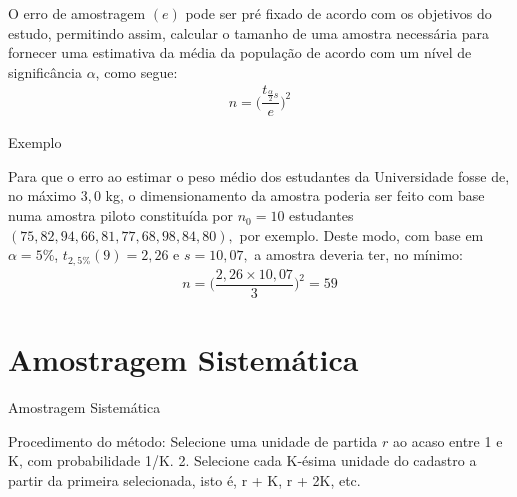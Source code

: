\documentclass[14pt,aspectratio=1610]{beamer}
\begin{document}
\begin{frame}{}
    \begin{block}{}
    \justifying
O erro de amostragem $(e)$ pode ser pré fixado de acordo com os objetivos do
estudo, permitindo assim, calcular o tamanho de uma amostra necessária para fornecer uma estimativa da média da população de acordo com um nível de significância $\alpha$, como segue:
\begin{align*}
    n=\Big(\dfrac{t_{\frac{\alpha}{2}s}}{e}\Big)^{2}
\end{align*}
    \end{block}
\end{frame}

\begin{frame}{Exemplo}
    \begin{block}{}
    \justifying
Para que o erro ao estimar o peso médio dos estudantes da Universidade
fosse de, no máximo $3,0$ kg, o dimensionamento da amostra poderia ser feito com base numa amostra piloto constituída por $n_0 = 10$ estudantes $(75, 82, 94, 66, 81, 77, 68, 98, 84, 80),$ por exemplo. Deste modo, com base em $\alpha=5\%$, $t_{2,5\%}(9) = 2,26$ e $s = 10,07,$ a amostra deveria ter, no mínimo:
\begin{align*}
    n=\Big(\dfrac{2,26\times 10,07}{3}\Big)^{2}=59
\end{align*}
    \end{block}
\end{frame}

\section{Amostragem Sistemática}
\begin{frame}{Amostragem Sistemática}
    \begin{block}{}
    \justifying
Procedimento do método:
Selecione uma unidade de partida $r$ ao
acaso entre 1 e K, com probabilidade
1/K.
2. Selecione cada K-ésima unidade do
cadastro a partir da primeira selecionada,
isto é, r + K, r + 2K, etc.
    \end{block}
\end{frame}
\end{document}
